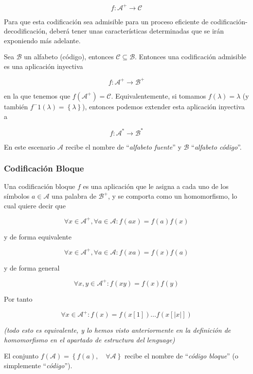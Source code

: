 \[
f:\mathcal{A}^+\rightarrow\mathcal{C}
\]

Para que esta codificación sea admisible para un proceso eficiente de
codificación-decodificación, deberá tener unas características
determinadas que se irán exponiendo más adelante.

Sea \(\mathcal{B}\) un alfabeto (código), entonces
\(\mathcal{C}\subseteq\mathcal{B}\). Entonces una codificación admisible
es una aplicación inyectiva

\[
f:\mathcal{A}^+\rightarrow\mathcal{B}^+
\]

en la que tenemos que \(f\left(\mathcal{A}^+\right) = \mathcal{C}\).
Equivalentemente, si tomamos \(f(\lambda) = \lambda\) (y también
\(f^-1(\lambda) = \left\{\lambda\right\}\)), entonces podemos extender
esta aplicación inyectiva a

\[
f:\mathcal{A}^*\rightarrow\mathcal{B}^*
\]

En este escenario \(\mathcal{A}\) recibe el nombre de ``\emph{alfabeto
fuente}'' y \(\mathcal{B}\) ``\emph{alfabeto código}''.

\subsubsection{Codificación Bloque}\label{codificaciuxf3n-bloque}

Una codificación bloque \(f\) es una aplicación que le asigna a cada uno
de los símbolos \(a\in\mathcal{A}\) una palabra de \(\mathcal{B}^+\), y
se comporta como un homomorfismo, lo cual quiere decir que

\[
\forall x\in\mathcal{A}^+,\forall a\in\mathcal{A}: f(ax) = f(a)f(x)
\]

y de forma equivalente

\[
\forall x\in\mathcal{A}^+,\forall a\in\mathcal{A}: f(xa) = f(x)f(a)
\]

y de forma general

\[
\forall x,y\in\mathcal{A}^+: f(xy) = f(x)f(y)
\]

Por tanto

\[
\forall x\in\mathcal{A}^+: f(x) = f(x[1])\dots f(x[|x|])
\]

\emph{(todo esto es equivalente, y lo hemos visto anteriormente en la
definición de homomorfismo en el apartado de estructura del lenguage)}

El conjunto
\(f(\mathcal{A})=\left\{f(a),\quad\forall\mathcal{A}\right\}\) recibe el
nombre de ``\emph{código bloque}'' (o simplemente ``\emph{código}'').

